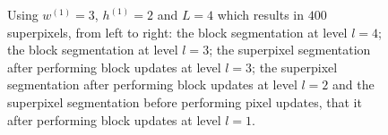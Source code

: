 \begin{figure}[t]
{	}
	\caption[An illustration of the block hierarchy used by \textbf{SEEDS} \cite{VanDenBerghBoixRoigCapitaniVanGool:2012} to exchange blocks between superpixels of an initial superpixel segmentation.]{Using $w^{(1)} = 3$, $h^{(1)} = 2$ and $L = 4$ which results in $400$ superpixels, from left to right: the block segmentation at level $l = 4$; the block segmentation at level $l = 3$; the superpixel segmentation after performing block updates at level $l = 3$; the superpixel segmentation after performing block updates at level $l = 2$ and the superpixel segmentation before performing pixel updates, that it after performing block updates at level $l = 1$.}
	\label{fig:superpixel-segmentation-seeds-blocks}
\end{figure}


